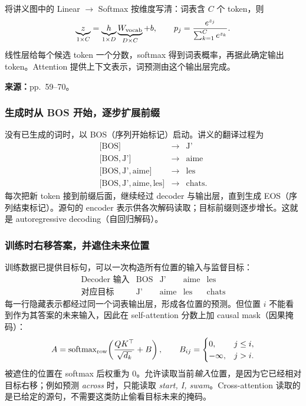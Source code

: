 将讲义图中的 Linear $\to$ Softmax 按维度写清：词表含 $C$ 个 token，则
\[
 \underbrace{z}_{1\times C}
 =\underbrace{h}_{1\times D}\underbrace{W_{\rm vocab}}_{D\times C}+b,
 \qquad
 p_j=\frac{e^{z_j}}{\sum_{k=1}^{C}e^{z_k}}.
\]
线性层给每个候选 token 一个分数，softmax 得到词表概率，再据此确定输出 token。Attention 提供上下文表示，词预测由这个输出层完成。


\textbf{来源：}pp.~59--70。

\subsubsection{生成时从 BOS 开始，逐步扩展前缀}

没有已生成的词时，以 BOS（序列开始标记）启动。讲义的翻译过程为
\[
 \begin{array}{rcl}
 \lbrack\mathrm{BOS}\rbrack&\longrightarrow&\text{J'}\\
 \lbrack\mathrm{BOS},\text{J'}\rbrack&\longrightarrow&\text{aime}\\
 \lbrack\mathrm{BOS},\text{J'},\text{aime}\rbrack&\longrightarrow&\text{les}\\
 \lbrack\mathrm{BOS},\text{J'},\text{aime},\text{les}\rbrack&\longrightarrow&\text{chats}.
 \end{array}
\]
每次把新 token 接到前缀后面，继续经过 decoder 与输出层，直到生成 EOS（序列结束标记）。源句的 encoder 表示供各次解码读取；目标前缀则逐步增长。这就是 autoregressive decoding（自回归解码）。

\subsubsection{训练时右移答案，并遮住未来位置}

训练数据已提供目标句，可以一次构造所有位置的输入与监督目标：
\[
 \begin{array}{c|cccc}
 \text{Decoder 输入}&\mathrm{BOS}&\text{J'}&\text{aime}&\text{les}\\
 \text{对应目标}&\text{J'}&\text{aime}&\text{les}&\text{chats}
 \end{array}
\]
每一行隐藏表示都经过同一个词表输出层，形成各位置的预测。但位置 $i$ 不能看到作为其答案的未来输入，因此在 self-attention 分数上加 causal mask（因果掩码）：
\[
 A=\operatorname{softmax}_{\rm row}\!\left(\frac{QK^\top}{\sqrt{d_k}}+B\right),
 \qquad
 B_{ij}=\begin{cases}0,&j\le i,\\-\infty,&j>i.\end{cases}
\]
被遮住的位置在 softmax 后权重为 $0$。允许读取当前\emph{输入}位置，是因为它已经相对目标右移；例如预测 \emph{across} 时，只能读取 \emph{start, I, swam}。Cross-attention 读取的是已给定的源句，不需要这类防止偷看目标未来的掩码。

